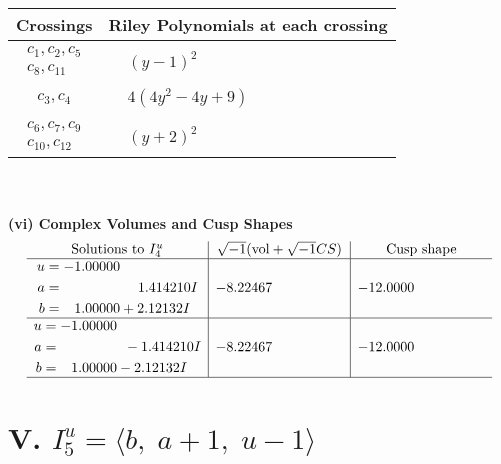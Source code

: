 \documentclass[1p]{elsarticle_modified}
\theoremstyle{definition}
\newcommand{\I}{\sqrt{-1}}
\begin{document}
\begin{tabular}{m{50pt}|m{274pt}}
Crossings & \hspace{64pt}Riley Polynomials at each crossing \\
\hline $$\begin{aligned}c_{1},c_{2},c_{5}\\c_{8},c_{11}\end{aligned}$$&$\begin{aligned}
&(y-1)^2
\end{aligned}$\\
\hline $$\begin{aligned}c_{3},c_{4}\end{aligned}$$&$\begin{aligned}
&4(4 y^2-4 y+9)
\end{aligned}$\\
\hline $$\begin{aligned}c_{6},c_{7},c_{9}\\c_{10},c_{12}\end{aligned}$$&$\begin{aligned}
&(y+2)^2
\end{aligned}$\\
\hline
\end{tabular}\\~\\
\newpage\flushleft \textbf{(vi) Complex Volumes and Cusp Shapes}
$$\begin{array}{c|c|c}  
\text{Solutions to }I^u_{4}& \I (\text{vol} + \sqrt{-1}CS) & \text{Cusp shape}\\
 \hline 
\begin{aligned}
u &= -1.00000\phantom{ +0.000000I} \\
a &= \phantom{-0.000000 -}1.414210 I \\
b &= \phantom{-}1.00000 + 2.12132 I\end{aligned}
 & -8.22467\phantom{ +0.000000I} & -12.0000\phantom{ +0.000000I} \\ \hline\begin{aligned}
u &= -1.00000\phantom{ +0.000000I} \\
a &= \phantom{-0.000000 } -1.414210 I \\
b &= \phantom{-}1.00000 - 2.12132 I\end{aligned}
 & -8.22467\phantom{ +0.000000I} & -12.0000\phantom{ +0.000000I}\\
 \hline 
 \end{array}$$\newpage\newpage\renewcommand{\arraystretch}{1}
\centering \section*{V. $I^u_{5}= \langle b,\;a+1,\;u-1 \rangle$}
\end{document}
